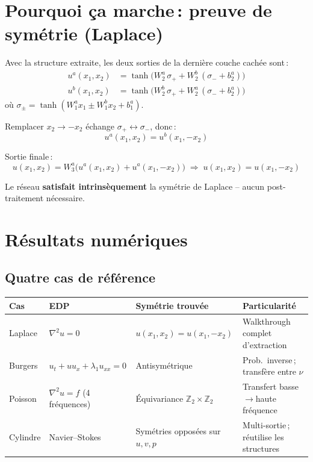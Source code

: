 \documentclass[11pt,a4paper]{article}
\begin{document}
\section{Pourquoi ça marche\,: preuve de symétrie (Laplace)}

Avec la structure extraite, les deux sorties de la dernière couche cachée sont\,:
\begin{align}
u^a(x_1,x_2) &= \tanh\!\big(W_2^a\,\sigma_+ + W_2^b\,(\sigma_- + b_2^a)\big) \\
u^b(x_1,x_2) &= \tanh\!\big(W_2^b\,\sigma_+ + W_2^a\,(\sigma_- + b_2^a)\big)
\end{align}
où $\sigma_\pm = \tanh(W_1^a x_1 \pm W_1^b x_2 + b_1^a)$.

Remplacer $x_2\to -x_2$ échange $\sigma_+\leftrightarrow\sigma_-$, donc\,:
\begin{equation}
\boxed{u^a(x_1,x_2) = u^b(x_1,-x_2)}
\end{equation}

Sortie finale\,:
\begin{equation}
u(x_1,x_2) = W_3^a\big(u^a(x_1,x_2)+u^a(x_1,-x_2)\big) \;\Longrightarrow\; u(x_1,x_2)=u(x_1,-x_2)
\end{equation}

Le réseau \textbf{satisfait intrinsèquement} la symétrie de Laplace -- aucun post-traitement nécessaire.

\section{Résultats numériques}

\subsection{Quatre cas de référence}

\begin{center}
\renewcommand{\arraystretch}{1.25}
\begin{tabular}{@{}l l l l@{}}
\toprule
\textbf{Cas} & \textbf{EDP} & \textbf{Symétrie trouvée} & \textbf{Particularité} \\
\midrule
Laplace    & $\nabla^2 u=0$ & $u(x_1,x_2)=u(x_1,-x_2)$ & Walkthrough complet d'extraction \\
Burgers    & $u_t+uu_x+\lambda_1 u_{xx}=0$ & Antisymétrique & Prob.\ inverse\,; transfère entre $\nu$ \\
Poisson    & $\nabla^2 u=f$ (4 fréquences) & Équivariance $\mathbb{Z}_2\!\times\!\mathbb{Z}_2$ & Transfert basse$\to$haute fréquence \\
Cylindre   & Navier--Stokes & Symétries opposées sur $u,v,p$ & Multi-sortie\,; réutilise les structures \\
\bottomrule
\end{tabular}
\end{center}
\end{document}
